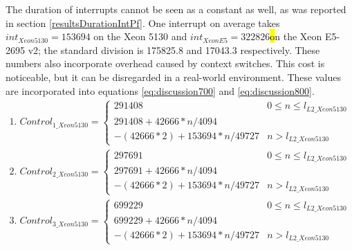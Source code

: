 The duration of interrupts cannot be seen as a constant as well, as was reported in section \ref{resultsDurationIntPf}. One interrupt on average takes $int_{Xeon5130} = 153694$ on the Xeon 5130 and $int_{XeonE5} = 322826$\hl on the Xeon E5-2695 v2; the standard division is 175825.8 and 17043.3 respectively. These numbers also incorporate overhead caused by context switches. This cost is noticeable, but it can be disregarded in a real-world environment. These values are incorporated into equations \ref{eq:discussion700} and \ref{eq:discussion800}. 
\begin{equation}\label{eq:discussion700}
\begin{split}
1.\; Control_{1\_Xeon5130} = \begin{cases}291408 & 0 \leq n \leq l_{L2\_Xeon5130} \\ 291408 + 42666 * n / 4094 \\ - (42666 * 2) + 153694 * n / 49727 & n > l_{L2\_Xeon5130}\end{cases} \\
2.\; Control_{2\_Xeon5130} = \begin{cases}297691 & 0 \leq n \leq l_{L2\_Xeon5130} \\ 297691 + 42666 * n / 4094 \\ - (42666 * 2) + 153694 * n / 49727 & n > l_{L2\_Xeon5130}\end{cases} \\
3.\; Control_{3\_Xeon5130} = \begin{cases}699229 & 0 \leq n \leq l_{L2\_Xeon5130} \\ 699229 + 42666 * n / 4094 \\ - (42666 * 2) + 153694 * n / 49727 & n > l_{L2\_Xeon5130}\end{cases} \\
\end{split}
\end{equation}

